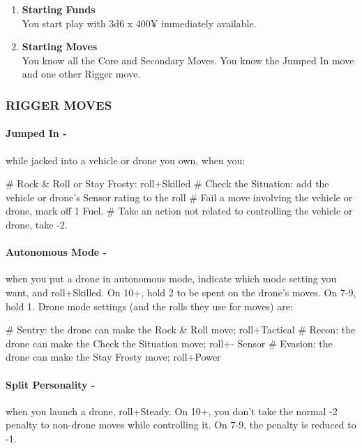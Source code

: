 \begin{enumerate}
    \item \textbf{Starting Funds} \\
    You start play with 3d6 x 400¥ immediately available.
    
    \item \textbf{Starting Moves} \\
    You know all the Core and Secondary Moves. You know the Jumped In move and one other Rigger move.
\end{enumerate}

\subsubsection{RIGGER MOVES}
\paragraph{Jumped In -} while jacked into a vehicle or drone you own, when you:
    \begin{easylist}
        # Rock \& Roll or Stay Frosty: roll+Skilled
        # Check the Situation: add the vehicle or drone’s Sensor rating to the roll
        # Fail a move involving the vehicle or drone, mark off 1 Fuel.
        # Take an action not related to controlling the vehicle or drone, take -2.
    \end{easylist}

\paragraph{Autonomous Mode -} when you put a drone in autonomous mode, indicate which mode setting you want, and roll+Skilled. On 10+, hold 2 to be spent on the drone’s moves. On 7-9, hold 1. Drone mode settings (and the rolls they use for moves) are:
    \begin{easylist}
        # Sentry: the drone can make the Rock \& Roll move; roll+Tactical
        # Recon: the drone can make the Check the Situation move; roll+- Sensor
        # Evasion: the drone can make the Stay Frosty move; roll+Power
    \end{easylist}

\paragraph{Split Personality -} when you launch a drone, roll+Steady. On 10+, you don’t take the normal -2 penalty to non-drone moves while controlling it. On 7-9, the penalty is reduced to -1.

